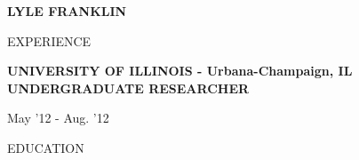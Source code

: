 \documentclass[a4paper,10pt]{article}
\newcommand{\name}[1]{\textbf{\huge{#1}}}
\begin{document}
\name{LYLE FRANKLIN}

\begin{minipage}[t]{0.6\textwidth}
{\Large EXPERIENCE}

\hrulefill

\textbf{UNIVERSITY OF ILLINOIS - Urbana-Champaign, IL}
\textbf{UNDERGRADUATE RESEARCHER}

May '12 - Aug. '12

\end{minipage}
\hspace{0.1 in}
\begin{minipage}[t]{0.3\textwidth}
EDUCATION

\hrulefill
\end{minipage}
\end{document}
